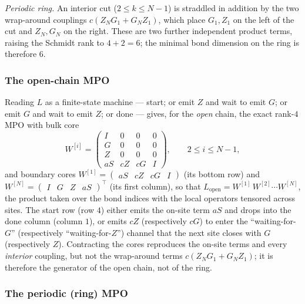 \documentclass[12pt]{article}
\theoremstyle{definition}
\theoremstyle{remark}
\begin{document}
\emph{Periodic ring.} An interior cut ($2 \le k \le N-1$) is straddled in addition by the two wrap-around couplings $c(Z_N G_1 + G_N Z_1)$, which place $G_1, Z_1$ on the left of the cut and $Z_N, G_N$ on the right. These are two further independent product terms, raising the Schmidt rank to $4 + 2 = 6$; the minimal bond dimension on the ring is therefore $6$.
\subsubsection{The open-chain MPO}

Reading $L$ as a finite-state machine --- start; or emit $Z$ and wait to emit $G$; or emit $G$ and wait to emit $Z$; or done --- gives, for the \emph{open} chain, the exact rank-$4$ MPO with bulk core
\[
W^{[i]} =
\begin{pmatrix}
I  & 0   & 0   & 0 \\
G  & 0   & 0   & 0 \\
Z  & 0   & 0   & 0 \\
aS & cZ  & cG  & I
\end{pmatrix},
\qquad 2 \le i \le N-1,
\]
and boundary cores $W^{[1]} = \begin{pmatrix} aS & cZ & cG & I \end{pmatrix}$ (its bottom row) and $W^{[N]} = \begin{pmatrix} I & G & Z & aS \end{pmatrix}^{\!\top}$ (its first column), so that $L_{\mathrm{open}} = W^{[1]}\,W^{[2]} \cdots W^{[N]}$, the product taken over the bond indices with the local operators tensored across sites. The start row (row $4$) either emits the on-site term $aS$ and drops into the done column (column $1$), or emits $cZ$ (respectively $cG$) to enter the ``waiting-for-$G$'' (respectively ``waiting-for-$Z$'') channel that the next site closes with $G$ (respectively $Z$). Contracting the cores reproduces the on-site terms and every \emph{interior} coupling, but not the wrap-around terms $c(Z_N G_1 + G_N Z_1)$; it is therefore the generator of the open chain, not of the ring.

\subsubsection{The periodic (ring) MPO}
\end{document}

